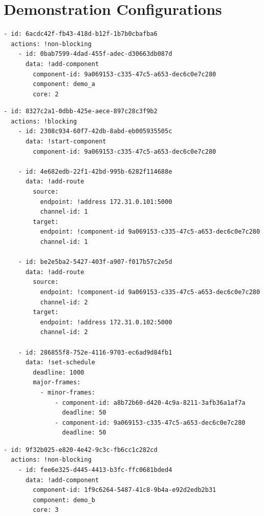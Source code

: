 \appendix
\chapter{Demonstration Configurations}


\begin{lstlisting}[caption=Demonstration configuration 1 task A (Yaml), label={lst:configDemonstration1a},captionpos=b]
- id: 6acdc42f-fb43-418d-b12f-1b7b0cbafba6
  actions: !non-blocking
    - id: 0bab7599-4dad-455f-adec-d30663db087d
      data: !add-component
        component-id: 9a069153-c335-47c5-a653-dec6c0e7c280
        component: demo_a
        core: 2
\end{lstlisting}

\begin{lstlisting}[caption=Demonstration configuration 1 task B (Yaml), label={lst:configDemonstration1b},captionpos=b]
- id: 8327c2a1-0dbb-425e-aece-897c28c3f9b2
  actions: !blocking
    - id: 2308c934-60f7-42db-8abd-eb005935505c
      data: !start-component
        component-id: 9a069153-c335-47c5-a653-dec6c0e7c280

    - id: 4e682edb-22f1-42bd-995b-6282f114688e
      data: !add-route
        source:
          endpoint: !address 172.31.0.101:5000
          channel-id: 1
        target:
          endpoint: !component-id 9a069153-c335-47c5-a653-dec6c0e7c280
          channel-id: 1

    - id: be2e5ba2-5427-403f-a907-f017b57c2e5d
      data: !add-route
        source:
          endpoint: !component-id 9a069153-c335-47c5-a653-dec6c0e7c280
          channel-id: 2
        target:
          endpoint: !address 172.31.0.102:5000
          channel-id: 2

    - id: 286855f8-752e-4116-9703-ec6ad9d84fb1
      data: !set-schedule
        deadline: 1000
        major-frames:
          - minor-frames:
              - component-id: a8b72b60-d420-4c9a-8211-3afb36a1af7a
                deadline: 50
              - component-id: 9a069153-c335-47c5-a653-dec6c0e7c280
                deadline: 50
 \end{lstlisting}

\begin{lstlisting}[caption=Demonstration configuration 2 task A (Yaml), label={lst:configDemonstration2a},captionpos=b]
- id: 9f32b025-e820-4e42-9c3c-fb6cc1c282cd
  actions: !non-blocking
    - id: fee6e325-d445-4413-b3fc-ffc0681bded4
      data: !add-component
        component-id: 1f9c6264-5487-41c8-9b4a-e92d2edb2b31
        component: demo_b
        core: 3
\end{lstlisting}

